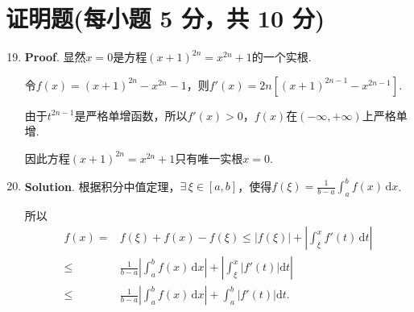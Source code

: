 \documentclass[../Main.tex]{subfiles}
\begin{document}
\section{证明题(每小题 5 分，共 10 分)}
\begin{enumerate}
    \setcounter{enumi}{18}
    \item \textbf{Proof}. 显然$x=0$是方程$(x+1)^{2n}=x^{2n}+1$的一个实根.

          令$f(x)=(x+1)^{2n}-x^{2n}-1$，则$f'(x)=2n\left[(x+1)^{2n-1}-x^{2n-1}\right]$.

          由于$t^{2n-1}$是严格单增函数，所以$f'(x)>0$，$f(x)$在$(-\infty,+\infty)$上严格单增.

          因此方程$(x+1)^{2n}=x^{2n}+1$只有唯一实根$x=0$.

    \item \textbf{Solution}. 根据积分中值定理，$\exists\,\xi\in[a,b]$，使得$f
              (\xi)=\frac{1}{b-a}\int_{a}^{b}f(x)\,\mathrm{d}x$.

          所以
          \[
              \begin{aligned}
                  f(x) = & f(\xi)+f(x)-f(\xi) \leq |f(\xi)|+\left|\int_{\xi}^{x}f'(t)\,\mathrm{d}t\right|                          \\
                  \leq   & \frac{1}{b-a}\left|\int_{a}^{b}f(x)\,\mathrm{d}x\right| + \left|\int_{\xi}^{x}|f'(t)|\mathrm{d}t\right| \\
                  \leq   & \frac{1}{b-a}\left|\int_{a}^{b}f(x)\,\mathrm{d}x\right| + \int_{a}^{b}|f'(t)|\mathrm{d}t.
              \end{aligned}
          \]
\end{enumerate}
\end{document}
